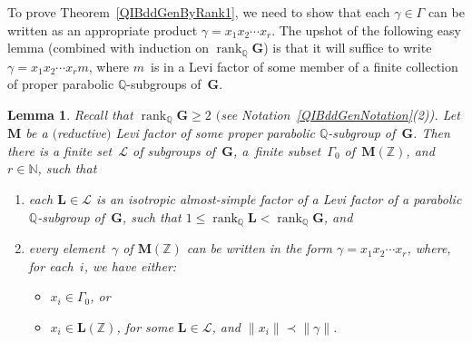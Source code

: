 \documentclass[pdftex]{sigma}
\newcommand{\NN}{\mathbb{N}}
\newcommand{\QQ}{\mathbb{Q}}
\newcommand{\ZZ}{\mathbb{Z}}
\newcommand{\Ga}{\mathbf{G}}
\newcommand{\La}{\mathbf{L}}
\newcommand{\Ma}{\mathbf{M}}
\DeclareMathOperator{\rank}{rank}
\newcommand{\subgroups}{\mathcal{L}}
\numberwithin{equation}{section}
\newtheorem{lem}[thm]{Lemma}
\theoremstyle{definition}
\begin{document}
To prove Theorem~\ref{QIBddGenByRank1}, we need to show that each $\gamma \in \Gamma$ can be written as an appropriate product $\gamma = x_1x_2\cdots x_r$. The upshot of the following easy lemma (combined with induction on $\rank_\QQ \Ga$) is that it will suffice to write $\gamma = x_1x_2\cdots x_r m$, where $m$~is in a Levi factor of some member of a finite collection of proper parabolic $\QQ$-subgroups of~$\Ga$.

\begin{lem} \label{LeviOK}
Recall that $\rank_\QQ \Ga \ge 2$ $($see Notation~{\rm \ref{QIBddGenNotation}(2))}.
Let $\Ma$ be a $($reductive$)$ Levi factor of some proper parabolic $\QQ$-subgroup of~$\Ga$. Then there is a finite set~$\subgroups$ of subgroups of~$\Ga$, a~finite subset~$\Gamma_0$ of~$\Ma(\ZZ)$, and $r \in \NN$, such that
\begin{enumerate}\itemsep=0pt
\item[$1)$] each $\La \in \subgroups$ is an isotropic almost-simple factor of a Levi factor of a parabolic $\QQ$-subgroup of~$\Ga$, such that $1 \le \rank_\QQ \La < \rank_\QQ \Ga$, and
\item[$2)$] every element~$\gamma$ of $\Ma(\ZZ)$ can be written in the form $\gamma = x_1 x_2 \cdots x_r$, where, for each~$i$, we have either:
\begin{itemize}\itemsep=0pt
\item $x_i \in \Gamma_0$, or
\item $x_i \in \La(\ZZ)$, for some $\La \in \subgroups$, and $\|x_i\| \prec \|\gamma\|$.
\end{itemize}
\end{enumerate}
\end{lem}
\end{document}
